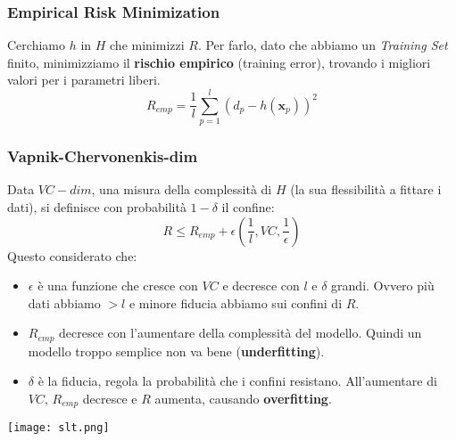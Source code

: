 \subsubsection{Empirical Risk Minimization}
Cerchiamo $h$ in $H$ che minimizzi $R$. Per farlo, dato che abbiamo un \textit{Training Set} finito, minimizziamo il \textbf{rischio empirico} (training error), trovando i migliori valori per i parametri liberi.
\begin{equation}
	R_{emp}=\frac{1}{l}\sum_{p=1}^{l}(d_p - h(\mathbf{x}_p))^2
\end{equation}
\subsubsection{Vapnik-Chervonenkis-dim}
Data $VC-dim$, una misura della complessità di $H$ (la sua flessibilità a fittare i dati), si definisce con probabilità $1-\delta$ il confine:
\begin{equation}
	R \leq R_{emp} + \epsilon (\frac{1}{l},VC, \frac{1}{\epsilon})
\end{equation}
Questo considerato che:
\begin{itemize}
	\item $\epsilon$ è una funzione che cresce con $VC$ e decresce con $l$ e $\delta$ grandi. Ovvero più dati abbiamo $>l$ e minore fiducia abbiamo sui confini di $R$.
	\item $R_{emp}$ decresce con l'aumentare della complessità del modello. Quindi un modello troppo semplice non va bene (\textbf{underfitting}).
	\item $\delta$ è la fiducia, regola la probabilità che i confini resistano. All'aumentare di $VC$, $R_{emp}$ decresce e $R$ aumenta, causando \textbf{overfitting}.
\end{itemize}
\begin{center}
	\texttt{[image: slt.png]}
\end{center}